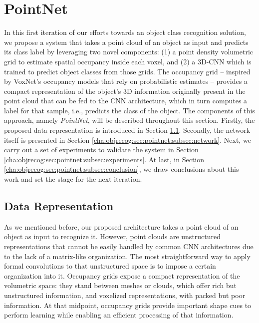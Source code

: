 \section{PointNet}
\label{cha:objrecog:sec:pointnet}

In this first iteration of our efforts towards an object class recognition solution, we propose a system that takes a point cloud of an object as input and predicts its class label by leveraging two novel components: (1) a point density volumetric grid to estimate spatial occupancy inside each voxel, and (2) a \ac{3D}-\ac{CNN} which is trained to predict object classes from those grids. The occupancy grid -- inspired by VoxNet's \cite{Maturana2015} occupancy models that rely on probabilistic estimates -- provides a compact representation of the object's \ac{3D} information originally present in the point cloud that can be fed to the \ac{CNN} architecture, which in turn computes a label for that sample, i.e., predicts the class of the object. The components of this approach, namely \emph{PointNet}, will be described throughout this section. Firstly, the proposed data representation is introduced in Section \ref{cha:objrecog:sec:pointnet:subsec:data}. Secondly, the network itself is presented in Section \ref{cha:objrecog:sec:pointnet:subsec:network}. Next, we carry out a set of experiments to validate the system in Section \ref{cha:objrecog:sec:pointnet:subsec:experiments}. At last, in Section \ref{cha:objrecog:sec:pointnet:subsec:conclusion}, we draw conclusions about this work and set the stage for the next iteration.

\subsection{Data Representation}
\label{cha:objrecog:sec:pointnet:subsec:data}

As we mentioned before, our proposed architecture takes a point cloud of an object as input to recognize it. However, point clouds are unstructured representations that cannot be easily handled by common \ac{CNN} architectures due to the lack of a matrix-like organization. The most straightforward way to apply formal convolutions to that unstructured space is to impose a certain organization into it. Occupancy grids expose a compact representation of the volumetric space: they stand between meshes or clouds, which offer rich but unstructured information, and voxelized representations, with packed but poor information. At that midpoint, occupancy grids provide important shape cues to perform learning while enabling an efficient processing of that information.

